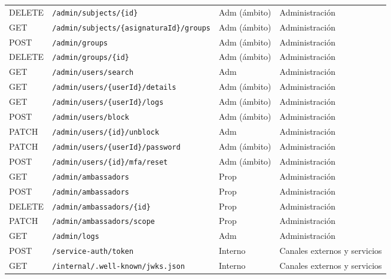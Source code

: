 \documentclass[11pt,a4paper]{report}
\begin{document}
\begin{center}
\begin{longtable}{@{}lp{7.3cm}p{2.8cm}p{3.4cm}@{}}
DELETE & \texttt{/\allowbreak{}admin/\allowbreak{}subjects/\allowbreak{}\{id\}} & Adm (ámbito) & Administración\\
GET & \texttt{/\allowbreak{}admin/\allowbreak{}subjects/\allowbreak{}\{asignaturaId\}/\allowbreak{}groups} & Adm (ámbito) & Administración\\
POST & \texttt{/\allowbreak{}admin/\allowbreak{}groups} & Adm (ámbito) & Administración\\
DELETE & \texttt{/\allowbreak{}admin/\allowbreak{}groups/\allowbreak{}\{id\}} & Adm (ámbito) & Administración\\
GET & \texttt{/\allowbreak{}admin/\allowbreak{}users/\allowbreak{}search} & Adm & Administración\\
GET & \texttt{/\allowbreak{}admin/\allowbreak{}users/\allowbreak{}\{userId\}/\allowbreak{}details} & Adm (ámbito) & Administración\\
GET & \texttt{/\allowbreak{}admin/\allowbreak{}users/\allowbreak{}\{userId\}/\allowbreak{}logs} & Adm (ámbito) & Administración\\
POST & \texttt{/\allowbreak{}admin/\allowbreak{}users/\allowbreak{}block} & Adm (ámbito) & Administración\\
PATCH & \texttt{/\allowbreak{}admin/\allowbreak{}users/\allowbreak{}\{id\}/\allowbreak{}unblock} & Adm & Administración\\
PATCH & \texttt{/\allowbreak{}admin/\allowbreak{}users/\allowbreak{}\{userId\}/\allowbreak{}password} & Adm (ámbito) & Administración\\
POST & \texttt{/\allowbreak{}admin/\allowbreak{}users/\allowbreak{}\{id\}/\allowbreak{}mfa/\allowbreak{}reset} & Adm (ámbito) & Administración\\
GET & \texttt{/\allowbreak{}admin/\allowbreak{}ambassadors} & Prop & Administración\\
POST & \texttt{/\allowbreak{}admin/\allowbreak{}ambassadors} & Prop & Administración\\
DELETE & \texttt{/\allowbreak{}admin/\allowbreak{}ambassadors/\allowbreak{}\{id\}} & Prop & Administración\\
PATCH & \texttt{/\allowbreak{}admin/\allowbreak{}ambassadors/\allowbreak{}scope} & Prop & Administración\\
GET & \texttt{/\allowbreak{}admin/\allowbreak{}logs} & Adm & Administración\\
POST & \texttt{/\allowbreak{}service-auth/\allowbreak{}token} & Interno & Canales externos y servicios\\
GET & \texttt{/\allowbreak{}internal/\allowbreak{}.well-known/\allowbreak{}jwks.json} & Interno & Canales externos y servicios\\

\end{longtable}
\end{center}
\end{document}
